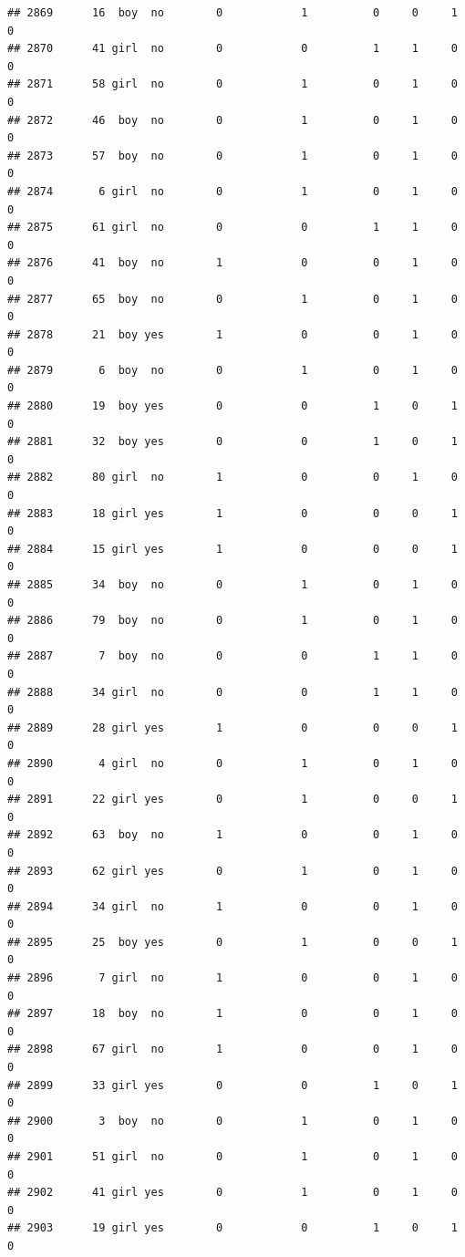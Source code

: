 \documentclass[man]{apa6}
\begin{document}
\begin{verbatim}
## 2869      16  boy  no        0            1          0     0     1     0
## 2870      41 girl  no        0            0          1     1     0     0
## 2871      58 girl  no        0            1          0     1     0     0
## 2872      46  boy  no        0            1          0     1     0     0
## 2873      57  boy  no        0            1          0     1     0     0
## 2874       6 girl  no        0            1          0     1     0     0
## 2875      61 girl  no        0            0          1     1     0     0
## 2876      41  boy  no        1            0          0     1     0     0
## 2877      65  boy  no        0            1          0     1     0     0
## 2878      21  boy yes        1            0          0     1     0     0
## 2879       6  boy  no        0            1          0     1     0     0
## 2880      19  boy yes        0            0          1     0     1     0
## 2881      32  boy yes        0            0          1     0     1     0
## 2882      80 girl  no        1            0          0     1     0     0
## 2883      18 girl yes        1            0          0     0     1     0
## 2884      15 girl yes        1            0          0     0     1     0
## 2885      34  boy  no        0            1          0     1     0     0
## 2886      79  boy  no        0            1          0     1     0     0
## 2887       7  boy  no        0            0          1     1     0     0
## 2888      34 girl  no        0            0          1     1     0     0
## 2889      28 girl yes        1            0          0     0     1     0
## 2890       4 girl  no        0            1          0     1     0     0
## 2891      22 girl yes        0            1          0     0     1     0
## 2892      63  boy  no        1            0          0     1     0     0
## 2893      62 girl yes        0            1          0     1     0     0
## 2894      34 girl  no        1            0          0     1     0     0
## 2895      25  boy yes        0            1          0     0     1     0
## 2896       7 girl  no        1            0          0     1     0     0
## 2897      18  boy  no        1            0          0     1     0     0
## 2898      67 girl  no        1            0          0     1     0     0
## 2899      33 girl yes        0            0          1     0     1     0
## 2900       3  boy  no        0            1          0     1     0     0
## 2901      51 girl  no        0            1          0     1     0     0
## 2902      41 girl yes        0            1          0     1     0     0
## 2903      19 girl yes        0            0          1     0     1     0

\end{verbatim}
\end{document}
